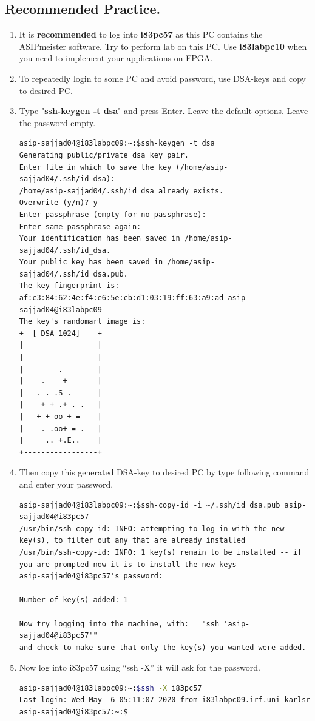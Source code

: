 \subsection{Recommended Practice.}
\begin{enumerate}[resume]
\item It is \textbf{recommended} to log into \textbf{i83pc57} as this PC contains the ASIPmeister software. Try to perform lab on this PC. Use \textbf{i83labpc10} when you need to implement your applications on FPGA.
\item To repeatedly login to some PC and avoid password, use DSA-keys and copy to desired PC.
\item Type "\textbf{ssh-keygen -t dsa}" and press Enter. Leave the default options. Leave the password empty.
\begin{lstlisting}
asip-sajjad04@i83labpc09:~:$ssh-keygen -t dsa
Generating public/private dsa key pair.
Enter file in which to save the key (/home/asip-sajjad04/.ssh/id_dsa):
/home/asip-sajjad04/.ssh/id_dsa already exists.
Overwrite (y/n)? y
Enter passphrase (empty for no passphrase):
Enter same passphrase again:
Your identification has been saved in /home/asip-sajjad04/.ssh/id_dsa.
Your public key has been saved in /home/asip-sajjad04/.ssh/id_dsa.pub.
The key fingerprint is:
af:c3:84:62:4e:f4:e6:5e:cb:d1:03:19:ff:63:a9:ad asip-sajjad04@i83labpc09
The key's randomart image is:
+--[ DSA 1024]----+
|                 |
|                 |
|        .        |
|    .    +       |
|   . . .S .      |
|    + + .+ . .   |
|   + + oo + =    |
|    . .oo+ = .   |
|     .. +.E..    |
+-----------------+
\end{lstlisting}
\item Then copy this generated DSA-key to desired PC by type following command and enter your password.
\begin{lstlisting}
asip-sajjad04@i83labpc09:~:$ssh-copy-id -i ~/.ssh/id_dsa.pub asip-sajjad04@i83pc57
/usr/bin/ssh-copy-id: INFO: attempting to log in with the new key(s), to filter out any that are already installed
/usr/bin/ssh-copy-id: INFO: 1 key(s) remain to be installed -- if you are prompted now it is to install the new keys
asip-sajjad04@i83pc57's password:

Number of key(s) added: 1

Now try logging into the machine, with:   "ssh 'asip-sajjad04@i83pc57'"
and check to make sure that only the key(s) you wanted were added.
\end{lstlisting}
\item Now log into i83pc57 using ``ssh -X'' it will ask for the password.
\begin{lstlisting}[language=bash]
asip-sajjad04@i83labpc09:~:$ssh -X i83pc57
Last login: Wed May  6 05:11:07 2020 from i83labpc09.irf.uni-karlsruhe.de
asip-sajjad04@i83pc57:~:$
\end{lstlisting}
\end{enumerate}
